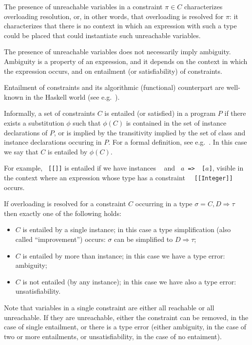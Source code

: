 The presence of unreachable variables in a constraint $\pi\in C$
characterizes overloading resolution, or, in other words, that
overloading is resolved for $\pi$: it characterizes that there is no
context in which an expression with such a type could be placed that
could instantiate such unreachable variables.

The presence of unreachable variables does not necessarily imply
ambiguity. Ambiguity is a property of an expression, and it depends on
the context in which the expression occurs, and on entailment (or
satisfiability) of constraints.

Entailment of constraints and its algorithmic (functional) counterpart
are well-known in the Haskell world (see
e.g.~\cite{MarkJones94a,TheoryOfOverloading,JBCS-Ambiguity-and-constrained-polymorphism}).

Informally, a set of constraints $C$ is entailed (or satisfied) in a
program $P$ if there exists a substitution $\phi$ such that $\phi(C)$
is contained in the set of instance declarations of $P$, or is implied
by the transitivity implied by the set of class and instance
declarations occuring in $P$. For a formal definition, see
e.g.~\cite{MarkJones94a,JBCS-Ambiguity-and-constrained-polymorphism}. In
this case we say that $C$ is entailed by $\phi(C)$. 

For example, {\tt \Eq\ [[\Integer]]} is entailed if we have instances
{\tt \Eq\ \Integer} and {\tt \Eq\ $a$ => \Eq\ [$a$]}, visible in the
context where an expression whose type has a constraint {\tt
  \Eq\ [[Integer]]} occurs.

If overloading is resolved for a constraint $C$ occurring in a type
$\sigma = C,D \Rightarrow \tau$ then exactly one of the following
holds:
\begin{itemize}

\item $C$ is entailed by a single instance; in this case a type
  simplification (also called ``improvement'') occurs: $\sigma$ can be
  simplified to $D \Rightarrow \tau$;

\item $C$ is entailed by more than instance; in this case we have a
  type error: ambiguity; 

\item $C$ is not entailed (by any instance); in this case we have also
  a type error: unsatisfiability.

\end{itemize}

Note that variables in a single constraint are either all reachable or
all unreachable. If they are unreachable, either the constraint can be
removed, in the case of single entailment, or there is a type error
(either ambiguity, in the case of two or more entailments, or
unsatisfiability, in the case of no entaiment).

